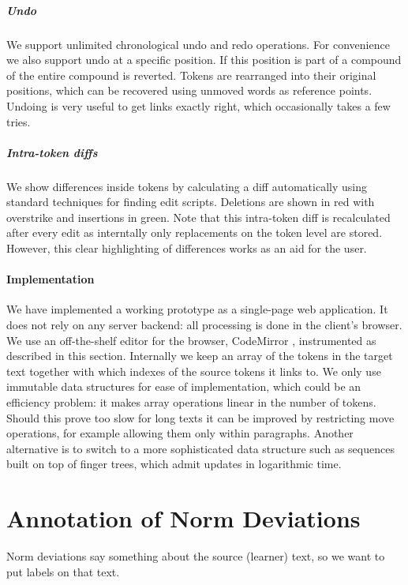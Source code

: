 \documentclass[10pt, a4paper]{article}
\newcommand{\commentDan}[1]{{\color{red}{Dan: #1}}}
\begin{document}
\subparagraph{Undo} We support unlimited chronological undo and redo operations.
For convenience we also support undo at a specific position. %
If this position is part of a compound of the entire compound is reverted. %
Tokens are rearranged into their original positions, which
can be recovered using unmoved words as reference points.
Undoing is very useful to get links exactly right, which occasionally takes a
few tries.

\subparagraph{Intra-token diffs} We show differences inside tokens by
calculating a diff automatically using standard techniques for finding
edit scripts.  Deletions are shown in red with overstrike and insertions
in green.  Note that this intra-token diff is recalculated after every edit
as interntally only replacements on the token level are stored.  However,
this clear highlighting of differences works as an aid for the user.

\paragraph{Implementation}
We have implemented a working prototype as a single-page web application.
It does not rely on any server backend: all processing is done in the
client's browser. We use an off-the-shelf editor for the browser,
CodeMirror \cite{CodeMirror},
instrumented as described in this section.
Internally we keep an array of the tokens in the target text together with
which indexes of the source tokens it links to.  We only use immutable data
structures for ease of implementation,  which could be an efficiency problem:
it makes array operations linear in the number of tokens. Should
this prove too slow for long texts it can be improved by restricting move
operations, for example allowing them only within paragraphs. Another alternative is to
switch to a more sophisticated data structure such as sequences built on
top of finger trees, which admit updates in logarithmic time.

\section{Annotation of Norm Deviations}
\label{sec:ann_tool}

\commentDan{a memory dump}

Norm deviations say something about the source (learner) text,
so we want to put labels on that text.
\end{document}
